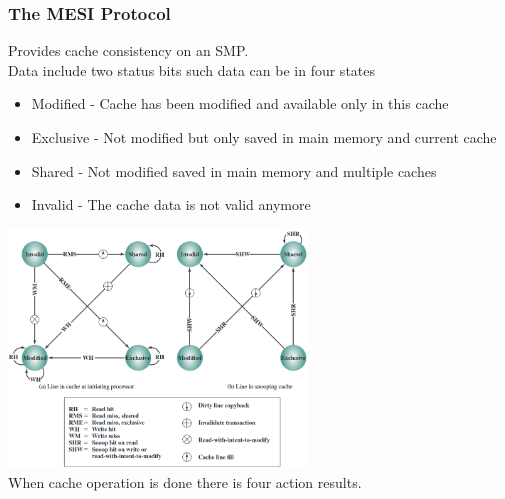 \documentclass[12pt, a4paper]{article}
\begin{document}
			\subsubsection{The MESI Protocol}
				Provides cache consistency on an SMP.\\
				Data include two status bits such data can be in four states
				\begin{itemize}
					\item Modified - Cache has been modified and available only in this cache
					\item Exclusive - Not modified but only saved in main memory and current cache
					\item Shared - Not modified saved in main memory and multiple caches
					\item Invalid - The cache data is not valid anymore
				\end{itemize}
				\includegraphics[width=300px]{assets/MESI.png}\\
				When cache operation is done there is four action results.\\
\end{document}

